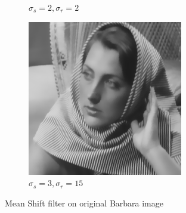 \documentclass[a4paper, landscape]{article}
\begin{document}
\begin{figure}
\begin{subfigure}{0.33\linewidth}
        \caption{$\sigma_s=2, \sigma_r=2$}
    \end{subfigure}
    \begin{subfigure}{0.33\linewidth}
        \centering
        \includegraphics[width=\linewidth]{barbara256,σ_spatial3,σ_range15.png}
        \caption{$\sigma_s=3, \sigma_r=15$}
    \end{subfigure}
    \caption{Mean Shift filter on original Barbara image}
    \label{fig:bs}
\end{figure}
\end{document}
